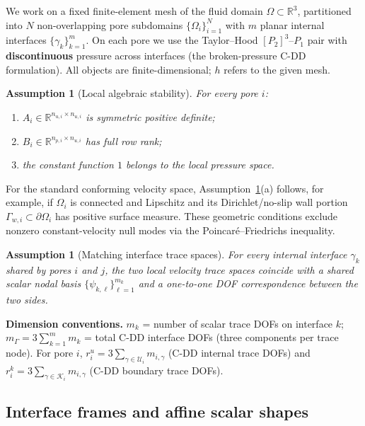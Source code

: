 \documentclass[11pt,a4paper]{article}
\newtheorem{assumption}[theorem]{Assumption}
\theoremstyle{definition}
\newcommand{\R}{\mathbb{R}}
\newcommand{\dom}{\Omega}
\newcommand{\pore}[1]{\Omega_{#1}}
\newcommand{\iface}{\gamma}
\begin{document}
We work on a fixed finite-element mesh of the fluid domain
$\dom\subset\R^3$, partitioned into $N$ non-overlapping pore subdomains
$\{\pore{i}\}_{i=1}^N$ with $m$ planar internal interfaces
$\{\iface_k\}_{k=1}^m$.  On each pore we use the Taylor--Hood
$[P_2]^3$--$P_1$ pair with \textbf{discontinuous} pressure across
interfaces (the broken-pressure C-DD formulation).  All objects are
finite-dimensional; $h$ refers to the given mesh.

\begin{assumption}[Local algebraic stability]\label{ass:local}
  For every pore $i$:
  \begin{enumerate}[label=(\alph*),nosep,leftmargin=*]
    \item $A_i \in \R^{n_{u,i}\times n_{u,i}}$ is symmetric positive definite;
    \item $B_i \in \R^{n_{p,i}\times n_{u,i}}$ has full row rank;
    \item the constant function $1$ belongs to the local pressure space.
  \end{enumerate}
\end{assumption}

For the standard conforming velocity space, Assumption~\ref{ass:local}(a)
follows, for example, if $\pore{i}$ is connected and Lipschitz and its
Dirichlet/no-slip wall portion $\Gamma_{w,i}\subset\partial\pore{i}$ has
positive surface measure.  These geometric conditions exclude nonzero
constant-velocity null modes via the Poincar\'e--Friedrichs inequality.

\begin{assumption}[Matching interface trace spaces]\label{ass:matching}
  For every internal interface $\iface_k$ shared by pores $i$ and $j$,
  the two local velocity trace spaces coincide with a shared scalar
  nodal basis $\{\psi_{k,\ell}\}_{\ell=1}^{m_k}$ and a one-to-one DOF
  correspondence between the two sides.
\end{assumption}

\medskip\noindent
\textbf{Dimension conventions.}
$m_k$ = number of scalar trace DOFs on interface $k$;
$m_\Gamma = 3\sum_{k=1}^m m_k$ = total C-DD interface DOFs
(three components per trace node).
For pore $i$,
$r_i^u = 3\sum_{\gamma\in\mathcal{U}_i} m_{i,\gamma}$
(C-DD internal trace DOFs) and
$r_i^k = 3\sum_{\gamma\in\mathcal{K}_i} m_{i,\gamma}$
(C-DD boundary trace DOFs).

\subsection{Interface frames and affine scalar shapes}
\end{document}
